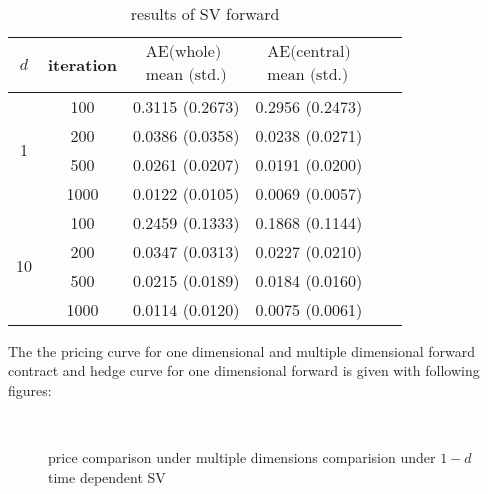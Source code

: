 \documentclass[11pt,a4paper]{article}
\theoremstyle{remark}
\begin{document}
	
	\begin{table}[H]
		\centering
		\begin{tabular}{cccccc}
			\hline$d$ & iteration & $\begin{array}{c}\text{AE(whole)} \\
				\text{mean (std.)} \end{array}$   & $\begin{array}{c}\text{AE(central)} \\
				\text{mean (std.)} \end{array}$  \\
			\hline \multirow{4}{*}{1} & 100 & 0.3115 (0.2673) & 0.2956 (0.2473) \\
			& 200 & 0.0386 (0.0358) & 0.0238 (0.0271) \\
			& 500 & 0.0261 (0.0207) & 0.0191 (0.0200) \\
			& 1000 & 0.0122 (0.0105) & 0.0069 (0.0057) \\
			\hline \multirow{4}{*}{10} & 100 & 0.2459 (0.1333) & 0.1868 (0.1144) \\
			& 200 & 0.0347 (0.0313) & 0.0227 (0.0210) \\
			& 500 & 0.0215 (0.0189) & 0.0184 (0.0160) \\
			& 1000 & 0.0114 (0.0120) & 0.0075 (0.0061) \\
			
			\hline
		\end{tabular}
		\caption{results of SV forward}
		\label{tab:my_label}
	\end{table}
	The the pricing curve for one dimensional and multiple dimensional forward contract and hedge curve for one dimensional forward is given with following figures:
	\begin{figure}[H]
		\centering
		\quad
		\\
		\caption{price comparison under multiple dimensions comparision under $1-d$ time dependent SV}
		\label{fig:SV forward}
	\end{figure}
\end{document}
